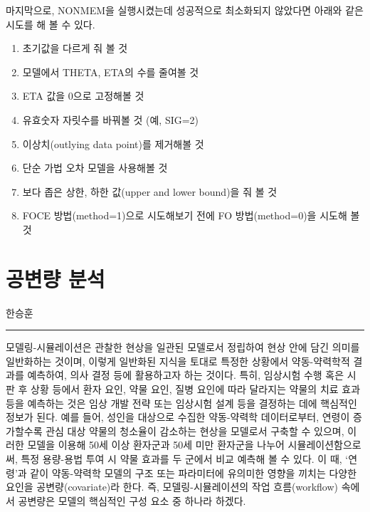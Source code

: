 \documentclass[
  11pt,
  krantz2, a4paper, twoside]{krantz}
\providecommand{\tightlist}{%
  \setlength{\itemsep}{0pt}\setlength{\parskip}{0pt}}
\theoremstyle{definition}
\theoremstyle{definition}
\theoremstyle{definition}
\theoremstyle{remark}
\begin{document}
마지막으로, NONMEM을 실행시켰는데 성공적으로 최소화되지 않았다면 아래와 같은 시도를 해 볼 수 있다.

\begin{enumerate}
\def\labelenumi{\arabic{enumi}.}
\tightlist
\item
  초기값을 다르게 줘 볼 것
\item
  모델에서 THETA, ETA의 수를 줄여볼 것
\item
  ETA 값을 0으로 고정해볼 것
\item
  유효숫자 자릿수를 바꿔볼 것 (예, SIG=2)
\item
  이상치(outlying data point)를 제거해볼 것 
\item
  단순 가법 오차 모델을 사용해볼 것
\item
  보다 좁은 상한, 하한 값(upper and lower bound)을 줘 볼 것
\item
  FOCE 방법(method=1)으로 시도해보기 전에 FO 방법(method=0)을 시도해 볼 것
\end{enumerate}

\hypertarget{covariate-analysis}{%
\chapter{공변량 분석}\label{covariate-analysis}}

\Large\hfill

한승훈
\normalsize

\begin{center}\rule{0.5\linewidth}{0.5pt}\end{center}

모델링-시뮬레이션은 관찰한 현상을 일관된 모델로서 정립하여 현상 안에 담긴 의미를 일반화하는 것이며, 이렇게 일반화된 지식을 토대로 특정한 상황에서 약동-약력학적 결과를 예측하여, 의사 결정 등에 활용하고자 하는 것이다. 특히, 임상시험 수행 혹은 시판 후 상황 등에서 환자 요인, 약물 요인, 질병 요인에 따라 달라지는 약물의 치료 효과 등을 예측하는 것은 임상 개발 전략 또는 임상시험 설계 등을 결정하는 데에 핵심적인 정보가 된다. 예를 들어, 성인을 대상으로 수집한 약동-약력학 데이터로부터, 연령이 증가할수록 관심 대상 약물의 청소율이 감소하는 현상을 모델로서 구축할 수 있으며, 이러한 모델을 이용해 50세 이상 환자군과 50세 미만 환자군을 나누어 시뮬레이션함으로써, 특정 용량-용법 투여 시 약물 효과를 두 군에서 비교 예측해 볼 수 있다. 이 때, `연령'과 같이 약동-약력학 모델의 구조 또는 파라미터에 유의미한 영향을 끼치는 다양한 요인을 공변량(covariate)라 한다. 즉, 모델링-시뮬레이션의 작업 흐름(workflow) 속에서 공변량은 모델의 핵심적인 구성 요소 중 하나라 하겠다.
\end{document}
